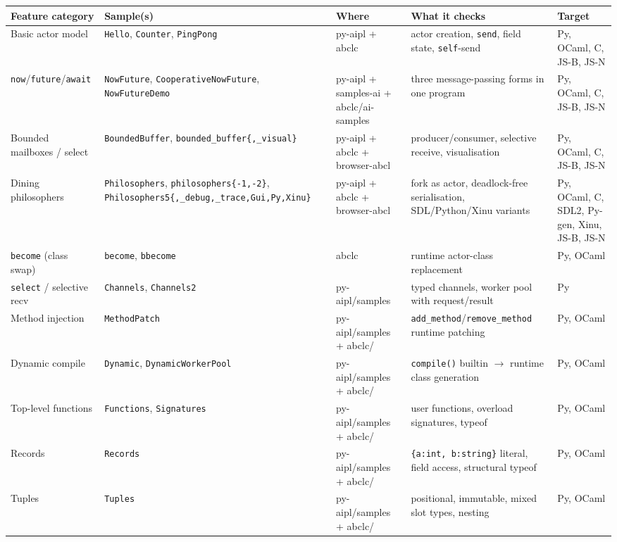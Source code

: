 \documentclass[10pt,a4paper,landscape]{article}
\begin{document}
\begin{longtable}{p{3.0cm} p{5.5cm} p{2.8cm} p{6.4cm} p{4.0cm}}
  \toprule
  \textbf{Feature category} & \textbf{Sample(s)} & \textbf{Where} & \textbf{What it checks} & \textbf{Target} \\
  \midrule
  \endhead

  Basic actor model & \texttt{Hello}, \texttt{Counter}, \texttt{PingPong} & py-aipl + abclc & actor creation, \texttt{send}, field state, \texttt{self}-send & Py, OCaml, C, JS-B, JS-N \\
  \texttt{now}/\texttt{future}/\texttt{await} & \texttt{NowFuture}, \texttt{CooperativeNowFuture}, \texttt{NowFutureDemo} & py-aipl + samples-ai + abclc/ai-samples & three message-passing forms in one program & Py, OCaml, C, JS-B, JS-N \\
  Bounded mailboxes / select & \texttt{BoundedBuffer}, \texttt{bounded\_buffer\{,\_visual\}} & py-aipl + abclc + browser-abcl & producer/consumer, selective receive, visualisation & Py, OCaml, C, JS-B, JS-N \\
  Dining philosophers & \texttt{Philosophers}, \texttt{philosophers\{-1,-2\}}, \texttt{Philosophers5\{,\_debug,\_trace,Gui,Py,Xinu\}} & py-aipl + abclc + browser-abcl & fork as actor, deadlock-free serialisation, SDL/Python/Xinu variants & Py, OCaml, C, SDL2, Py-gen, Xinu, JS-B, JS-N \\
  \texttt{become} (class swap) & \texttt{become}, \texttt{bbecome} & abclc & runtime actor-class replacement & Py, OCaml \\
  \texttt{select} / selective recv & \texttt{Channels}, \texttt{Channels2} & py-aipl/samples & typed channels, worker pool with request/result & Py \\
  Method injection & \texttt{MethodPatch} & py-aipl/samples + abclc/ & \texttt{add\_method}/\texttt{remove\_method} runtime patching & Py, OCaml \\
  Dynamic compile & \texttt{Dynamic}, \texttt{DynamicWorkerPool} & py-aipl/samples + abclc/ & \texttt{compile()} builtin $\to$ runtime class generation & Py, OCaml \\
  Top-level functions & \texttt{Functions}, \texttt{Signatures} & py-aipl/samples + abclc/ & user functions, overload signatures, typeof & Py, OCaml \\
  Records & \texttt{Records} & py-aipl/samples + abclc/ & \texttt{\{a:int, b:string\}} literal, field access, structural typeof & Py, OCaml \\
  Tuples & \texttt{Tuples} & py-aipl/samples + abclc/ & positional, immutable, mixed slot types, nesting & Py, OCaml \\

\end{longtable}
\end{document}
